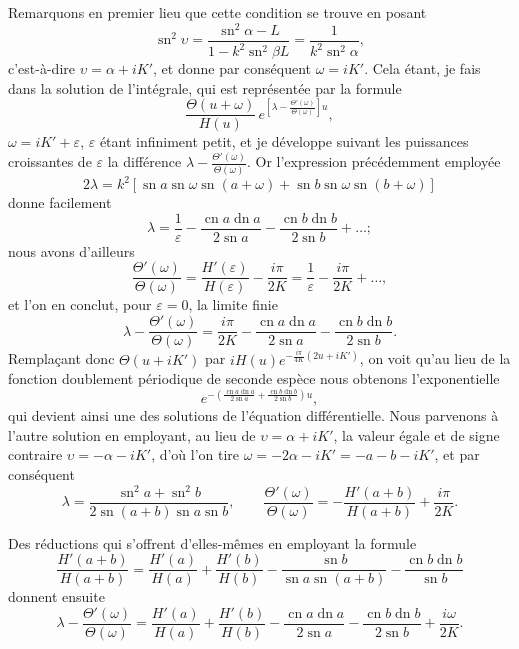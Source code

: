 \documentclass[11pt,leqno,oneside,letterpaper]{book}[2005/09/16]
\DeclareMathOperator{\sn}{sn}
\DeclareMathOperator{\cn}{cn}
\DeclareMathOperator{\dn}{dn}
\begin{document}
Remarquons en premier lieu que cette condition se trouve en posant
\[
\sn^2 \upsilon = \frac{\sn^2 \alpha - L}{1 - k^2 \sn^2 \beta L}
  = \frac{1}{ k^2 \sn^2 \alpha},
\]
c'est-\`a-dire $\upsilon = \alpha + iK'$, et donne par cons\'equent $\omega = iK'$. Cela \'etant,
je fais dans la solution de l'int\'egrale, qui est repr\'esent\'ee par la formule
\[
\frac{\Theta(u + \omega)}{H(u)}\,
e^{\left[\lambda - \frac{\Theta'(\omega)}{\Theta(\omega)}\right]u},
\]
$\omega = iK' + \varepsilon$, $\varepsilon$ \'etant infiniment petit, et je d\'eveloppe
suivant les puissances croissantes de $\varepsilon$ la diff\'erence $\lambda - \frac{\Theta'(\omega)}{\Theta(\omega)}$. Or l'expression
pr\'ec\'edemment employ\'ee
\[
2 \lambda = k^2 \left[ \sn a \sn \omega \sn(a + \omega) + \sn b \sn \omega \sn(b+\omega) \right]
\]
donne facilement
\[
\lambda = \frac{1}{\varepsilon} - \frac{\cn a \dn a}{2 \sn a} - \frac{\cn b \dn b}{2 \sn b} + \ldots;
\]
nous avons d'ailleurs
\[
\frac{\Theta'(\omega)}{\Theta (\omega)}
  = \frac{H'(\varepsilon)}{H (\varepsilon)} - \frac{i\pi}{2K}
  = \frac{1}{\varepsilon} - \frac{i\pi}{2K} + \ldots,
\]
et l'on en conclut, pour $\varepsilon = 0$, la limite finie
\[
\lambda - \frac{\Theta'(\omega)}{\Theta(\omega)}
  = \frac{i\pi}{2K} - \frac{\cn a\dn a}{2 \sn a} - \frac{\cn b \dn b}{2 \sn b}.
\]
Rempla\c{c}ant donc $\Theta(u + iK')$ par $iH(u)e^{-\frac{i\pi}{4K}(2u+iK')}$, on voit qu'au lieu de
la fonction doublement p\'eriodique de seconde esp\`ece nous obtenons l'exponentielle
\[
e^{-\left( \tfrac{\cn a \dn a}{2\sn a} + \tfrac{\cn b\dn b}{2\sn b}\right) u},
\]
qui devient ainsi une des solutions de l'\'equation
diff\'erentielle. Nous parvenons \`a l'autre solution en employant, au
lieu de $\upsilon = \alpha + iK'$, la valeur \'egale et de signe contraire $\upsilon = -\alpha - iK'$,
d'o\`u l'on tire $\omega = -2\alpha - iK' = -a-b-iK'$, et par cons\'equent
\[
\lambda = \frac{\sn^2 a + \sn^2 b}{2\sn (a+b)\sn a\sn b}, \qquad
\frac{\Theta'(\omega)}{\Theta(\omega)} = -\frac{H'(a + b)}{H(a + b)} + \frac{i\pi}{2K}.
\]

Des r\'eductions qui s'offrent d'elles-m\^emes en employant la formule
\[
\frac{H'(a + b)}{H(a + b)} = \frac{H'(a)}{H(a)}
                           + \frac{H'(b)}{H(b)}
                           - \frac{\sn b}{\sn a \sn(a+b)}
                           - \frac{\cn b\dn b}{\sn b}
\]
donnent ensuite
\[
\lambda - \frac{\Theta'(\omega)}{\Theta(\omega)}
  = \frac{H'(a)}{H(a)} + \frac{H'(b)}{H(b)}
  - \frac{\cn a \dn a}{2\sn a} - \frac{\cn b \dn b}{2\sn b}
  + \frac{i\omega}{2K}.
\]
\end{document}
